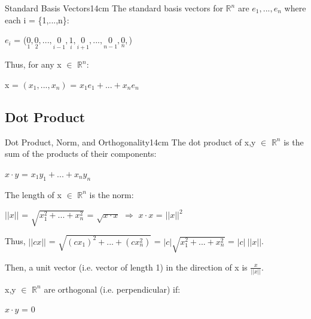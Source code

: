     \vspace{0.5cm}



    \begin{definition}{Standard Basis Vectors}{14cm}
        The {\color{lblue} standard basis vectors} for $\mathbb{R}^n$
        are $e_1,...,e_n$ where each i = \{1,...,n\}:

        \hspace{0.5cm}
        $e_i$ = ($\underset{\scriptscriptstyle 1}{0},
                    \underset{\scriptscriptstyle 2}{0},...,
                    \underset{\scriptscriptstyle i-1}{0},
                    \underset{\scriptscriptstyle i}{1},
                    \underset{\scriptscriptstyle i+1}{0},...,
                    \underset{\scriptscriptstyle n-1}{0},
                    \underset{\scriptscriptstyle n}{0},$)

        Thus, for any x $\in$ $\mathbb{R}^n$:

        \hspace{0.5cm}
        x = $(x_1,...,x_n)$
        = $x_1e_1 + ... + x_ne_n$
    \end{definition}

    \vspace{0.5cm}




\subsection{ Dot Product }

    \begin{definition}{Dot Product, Norm, and Orthogonality}{14cm}
        The {\color{lblue} dot product} of x,y $\in$ $\mathbb{R}^n$
        is the sum of the products of their components:
        
        \hspace{0.5cm}
        $x \cdot y$ = $x_1y_1 + ... + x_ny_n$

        \vspace{0.3cm}

        The length of x $\in$ $\mathbb{R}^n$ is the {\color{lblue} norm}:
        
        \hspace{0.5cm}
        $||x||$ = $\sqrt{x_1^2 + ... + x_n^2}$
        = $\sqrt{x \cdot x}$
        \hspace{1cm}
        $\Rightarrow$
        \hspace{1cm}
        $x \cdot x$ = $||x||^2$

        Thus, $||cx||$
        = $\sqrt{(cx_1)^2 + ... + (cx_n^2)}$
        = $|c| \sqrt{x_1^2 + ... + x_n^2}$
        = $|c| \ ||x||$.

        Then, a {\color{lblue} unit vector} (i.e. vector of length 1)
        in the direction of x is $\frac{x}{||x||}$.

        \vspace{0.3cm}

        x,y $\in$ $\mathbb{R}^n$ are {\color{lblue} orthogonal}
        (i.e. perpendicular) if:

        \hspace{0.5cm}
        $x \cdot y$ = 0
    \end{definition}

